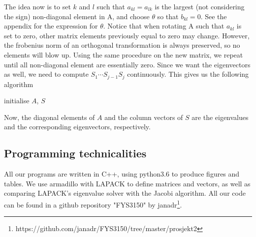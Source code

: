  The idea now is to set $k$ and $l$ such that $a_{kl}=a_{lk}$ is the largest (not considering the sign) non-diagonal element in A, and choose $\theta$ so that $b_{kl}=0$. See the appendix for the expression for $\theta$. 
Notice that when rotating A such that $a_{kl}$ is set to zero, other matrix elements previously equal to zero may change. However, the frobenius norm of an orthogonal transformation is always
preserved, so no elements will blow up.
Using the same procedure on the new matrix, we repeat until all non-diagonal element are essentially zero. Since we want the eigenvectors as well, we need to compute $S_1 \cdots S_{j-1}S_j$ continuously. This gives us the following algorithm
\begin{algorithm}[h!]
	\SetAlgoLined
	initialise $A$, $S$\;
\end{algorithm} 
 
\noindent Now, the diagonal elements of $A$ and the column vectors of $S$ are the eigenvalues and the corresponding eigenvectors, respectively. 

\subsection{Programming technicalities}
\label{sec:progtech}

All our programs are written in C++, using python3.6 to produce figures and tables.
We use armadillo with LAPACK to define matrices and vectors, as well as comparing
LAPACK's eigenvalue solver with the Jacobi algorithm. All our code can be found in
a github repository "FYS3150" by janadr\footnote{https://github.com/janadr/FYS3150/tree/master/prosjekt2}.
